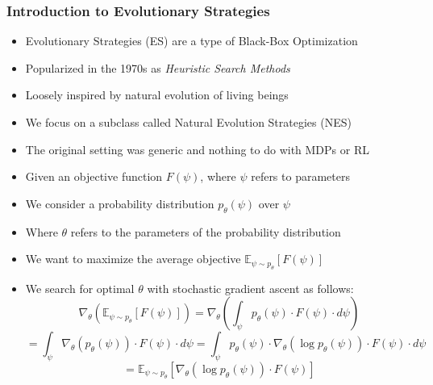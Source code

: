 \documentclass[handout]{beamer}
\begin{document}
\begin{frame}
\frametitle{Introduction to Evolutionary Strategies}
\begin{itemize}
\item Evolutionary Strategies (ES) are a type of Black-Box Optimization
\item Popularized in the 1970s as {\em Heuristic Search Methods}
\item Loosely inspired by natural evolution of living beings
\item We focus on a subclass called Natural Evolution Strategies (NES)
\item The original setting was generic and nothing to do with MDPs or RL
\item Given an objective function $F(\psi)$, where $\psi$ refers to parameters
\item We consider a probability distribution $p_{\theta}(\psi)$ over $\psi$
\item Where $\theta$ refers to the parameters of the probability distribution
\item We want to maximize the average objective $\mathbb{E}_{\psi \sim p_{\theta}}[F(\psi)]$
\item We search for optimal $\theta$ with stochastic gradient ascent as follows:
$$\nabla_{\theta} (\mathbb{E}_{\psi \sim p_{\theta}}[F(\psi)]) = \nabla_{\theta} (\int_{\psi} p_{\theta}(\psi) \cdot F(\psi) \cdot d\psi)$$
$$=\int_{\psi} \nabla_{\theta}(p_{\theta}(\psi)) \cdot F(\psi) \cdot d\psi = \int_{\psi} p_{\theta}(\psi) \cdot \nabla_{\theta}(\log{p_{\theta}(\psi)}) \cdot F(\psi) \cdot d\psi $$
$$ = \mathbb{E}_{\psi \sim p_{\theta}}[\nabla_{\theta}(\log{p_{\theta}(\psi)}) \cdot F(\psi)]$$
\end{itemize}
\end{frame}
\end{document}
